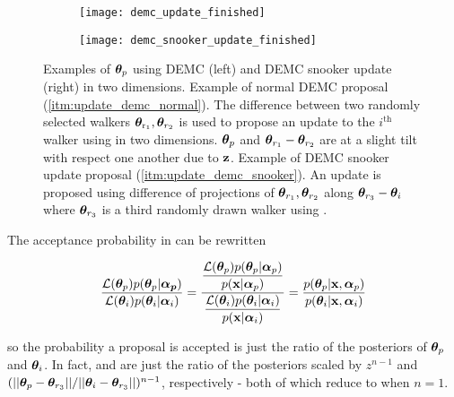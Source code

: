 \begin{figure}
\centering
\begin{subfigure}[t]{0.5\textwidth}
\centering
\texttt{[image: demc\_update\_finished]}
\end{subfigure}%
\begin{subfigure}[t]{0.5\textwidth}
\centering
\texttt{[image: demc\_snooker\_update\_finished]}
\end{subfigure}
\caption[Examples of $\vect{\theta}_p$ using DEMC and DEMC snooker update in two dimensions.]{Examples of $\vect{\theta}_p$ using DEMC (left)
and DEMC snooker update (right) in two dimensions.  Example of normal DEMC
proposal (\cref{itm:update_demc_normal}).  The difference between two randomly selected walkers
$\boldsymbol{\theta}_{\mathrm{r_1}}, \boldsymbol{\theta}_{r_2}$ is used to propose an update to the $i^{\mathrm{th}}$ walker using
 in two dimensions.  $\vect{\theta}_p$ and
$\boldsymbol{\theta}_{r_1} - \boldsymbol{\theta}_{r_2}$ are at a slight tilt with respect one another due to $\mathbf{z}$.  Example
of DEMC snooker update proposal (\cref{itm:update_demc_snooker}).  An update is proposed using difference of projections of
$\boldsymbol{\theta}_{r_1}, \boldsymbol{\theta}_{r_2}$ along $\boldsymbol{\theta}_{r_3} - \boldsymbol{\theta}_i$ where
$\boldsymbol{\theta}_{r_3}$ is a third randomly drawn walker using .}
\label{fig:elifetime_fit_mcmc_demc_diagram}
\end{figure}

The acceptance probability in  can be rewritten

\vspace{-5pt}

\begin{equation}
\frac{\mathcal{L}(\boldsymbol{\theta}_p) p(\boldsymbol{\theta}_p|\boldsymbol{\alpha_p})}
{\mathcal{L}(\boldsymbol{\theta}_i) p(\boldsymbol{\theta}_i|\boldsymbol{\alpha}_i)} =
\dfrac{\dfrac{\mathcal{L}(\boldsymbol{\theta}_p) p(\boldsymbol{\theta}_p|\boldsymbol{\alpha}_p)}{p(\mathbf{x}|\boldsymbol{\alpha}_p)}}
{\dfrac{\mathcal{L}(\boldsymbol{\theta}_i) p(\boldsymbol{\theta}_i|\boldsymbol{\alpha}_i)}{p(\mathbf{x}|\boldsymbol{\alpha}_i)}} =
\frac{p(\boldsymbol{\theta}_p|\mathbf{x}, \boldsymbol{\alpha}_p)}{p(\boldsymbol{\theta}_i|\mathbf{x}, \boldsymbol{\alpha}_i)}
\label{eq:elifetime_fit_mcmc_acc_ratio}
\end{equation}

\noindent so the probability a proposal is accepted is just the ratio of the posteriors of $\vect{\theta}_p$ and
$\boldsymbol{\theta}_i$.  In fact,  and
 are just the ratio of the posteriors scaled by $z^{n-1}$ and
$(||\boldsymbol{\theta}_p - \boldsymbol{\theta}_{r_3}|| / ||\boldsymbol{\theta}_i - \boldsymbol{\theta}_{r_3}||)^{n - 1}$, respectively - both
of which reduce to  when $n = 1$.

